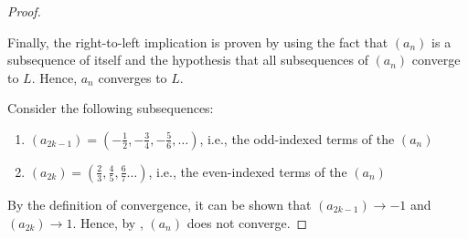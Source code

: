 \begin{problem}
\begin{proof}
\begin{subproof}
      Finally, the right-to-left implication is proven by using the fact that
      $(a_{n})$ is a subsequence of itself and the hypothesis that all
      subsequences of $(a_{n})$ converge to $L$. Hence, $a_{n}$ converges to $L$.
    \end{subproof}

    Consider the following subsequences:
    \begin{enumerate}[label=(\roman*)]
      \item $(a_{2k - 1}) = (-\frac{1}{2}, -\frac{3}{4}, -\frac{5}{6}, \ldots)$, i.e., the odd-indexed terms of the $(a_{n})$
      \item $(a_{2k}) = (\frac{2}{3}, \frac{4}{5}, \frac{6}{7} \ldots)$, i.e., the even-indexed terms of the $(a_{n})$
    \end{enumerate}
    By the definition of convergence, it can be shown that $(a_{2k - 1}) \to -1$ and $(a_{2k}) \to 1$.
    Hence, by , $(a_{n})$ does not converge.
  \end{proof}


\end{problem}
